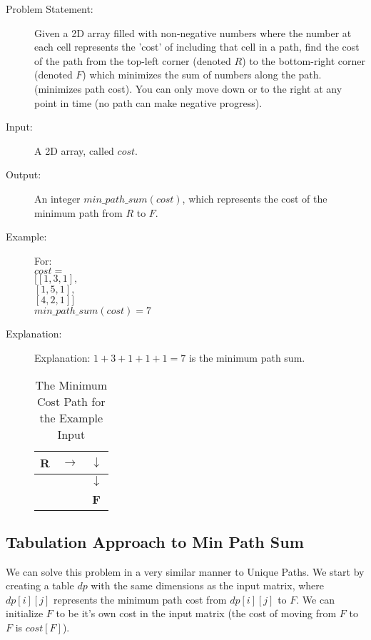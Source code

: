 \begin{description}
    \item[Problem Statement:]
        Given a 2D array filled with non-negative numbers where the number at each cell represents the 'cost' of including that cell in a path,
        find the cost of the path from the top-left corner (denoted $R$) to the bottom-right corner (denoted $F$) which minimizes the sum of numbers along the path.
        (minimizes path cost).
        You can only move down or to the right at any point in time (no path can make negative progress).

    \item[Input:]
        A 2D array, called $cost$.
        
    \item[Output:]
        An integer $min\_path\_sum(cost)$, which represents the cost of the minimum path from $R$ to $F$.
        
    \item[Example:] For:\\
    $cost = $\\
    $[[1,3,1],$\\
    $[1,5,1],$\\
    $[4,2,1]]$\\

    $min\_path\_sum(cost) = 7$

    \item[Explanation:]
        Explanation: $1 + 3 + 1 + 1 + 1 = 7$ is the minimum path sum.
        \begin{table}[H]
            \centering
            \begin{tabular}{|c|c|c|}
                \hline
                \textbf{R} & $\rightarrow$ & $\downarrow$ \\
                \hline
                 &  & $\downarrow$ \\
                \hline
                 &  & \textbf{F} \\
                \hline
            \end{tabular}
            \caption{The Minimum Cost Path for the Example Input}
        \end{table}
        
\end{description}

\subsection{Tabulation Approach to Min Path Sum}
We can solve this problem in a very similar manner to Unique Paths.
We start by creating a table $dp$ with the same dimensions as the input matrix, where $dp[i][j]$ represents the minimum path cost from $dp[i][j]$ to $F$.
We can initialize $F$ to be it's own cost in the input matrix (the cost of moving from $F$ to $F$ is $cost[F]$).

